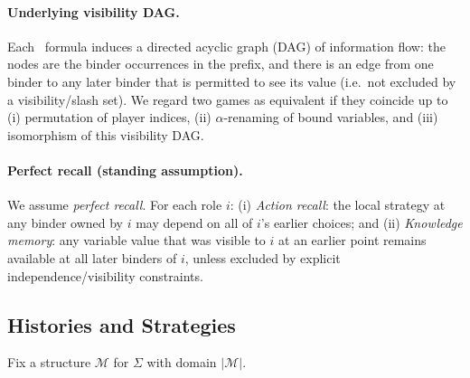 \paragraph{Underlying visibility DAG.}
Each \KFOL\ formula induces a directed acyclic graph (DAG) of information flow:
the nodes are the binder occurrences in the prefix, and there is an edge from
one binder to any later binder that is permitted to see its value (i.e.\ not
excluded by a visibility/slash set). We regard two games as equivalent if they
coincide up to (i) permutation of player indices, (ii) $\alpha$-renaming of
bound variables, and (iii) isomorphism of this visibility DAG.

\paragraph{Perfect recall (standing assumption).}
We assume \emph{perfect recall}. For each role $i$:
(i) \emph{Action recall}: the local strategy at any binder owned by $i$ may
depend on all of $i$'s earlier choices; and
(ii) \emph{Knowledge memory}: any variable value that was visible to $i$
at an earlier point remains available at all later binders of $i$,
unless excluded by explicit independence/visibility constraints.

\subsection{Histories and Strategies}

Fix a structure $\mathcal M$ for $\Sigma$ with domain $|\mathcal M|$.



